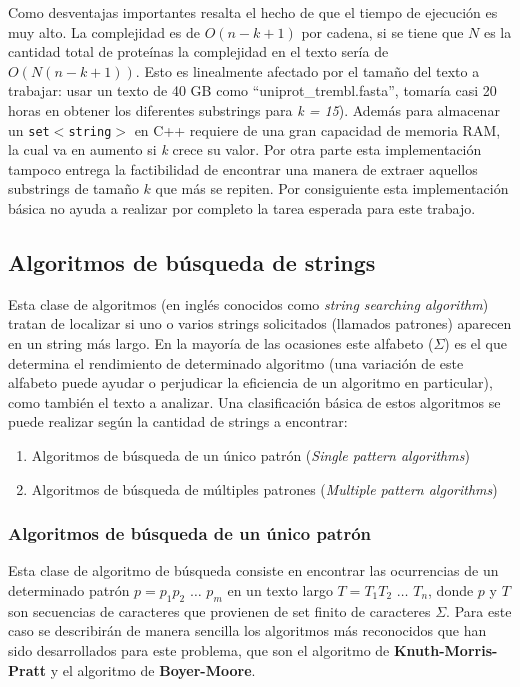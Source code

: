 Como desventajas importantes resalta el hecho de que el tiempo de ejecución es muy alto. La complejidad es de $O(n-k+1)$ por cadena, si se tiene que $N$ es la cantidad total de proteínas la complejidad en el texto sería de $O(N(n-k+1))$. Esto es linealmente afectado por el tamaño del texto a trabajar: usar un texto de 40 GB como ``uniprot\_trembl.fasta'', tomaría casi 20 horas en obtener los diferentes substrings para \textit{k = 15}). Además para almacenar un \texttt{set$<$string$>$} en C++ requiere de una gran capacidad de memoria RAM, la cual va en aumento si \textit{k} crece su valor. Por otra parte esta implementación tampoco entrega la factibilidad de encontrar una manera de extraer aquellos substrings de tamaño $k$ que más se repiten. Por consiguiente esta implementación básica no ayuda a realizar por completo la tarea esperada para este trabajo. 


\subsection{Algoritmos de búsqueda de strings}

Esta clase de algoritmos (en inglés conocidos como \textit{string searching algorithm}) tratan de localizar si uno o varios strings solicitados (llamados patrones) aparecen en un string más largo. En la mayoría de las ocasiones este alfabeto ($\Sigma$) es el que determina el rendimiento de determinado algoritmo (una variación de este alfabeto puede ayudar o perjudicar la eficiencia de un algoritmo en particular), como también el texto a analizar.
Una clasificación básica de estos algoritmos se puede realizar según la cantidad de strings a encontrar:
\begin{enumerate}
\item Algoritmos de búsqueda de un único patrón (\textit{Single pattern algorithms})
\item Algoritmos de búsqueda de múltiples patrones (\textit{Multiple pattern algorithms})
\end{enumerate}

\subsubsection{Algoritmos de búsqueda de un único patrón}

Esta clase de algoritmo de búsqueda consiste en encontrar las ocurrencias de un determinado patrón \cite{stringmatching} $p=p_{1}p_{2}$ $\ldots$ $p_{m}$ en un texto largo $T=T_{1}T_{2}$ $\ldots$ $T_{n}$, donde $p$ y $T$ son secuencias de caracteres que provienen de set finito de caracteres $\Sigma$.
Para este caso se describirán de manera sencilla los algoritmos más reconocidos que han sido desarrollados para este problema, que son el algoritmo de \textbf{Knuth-Morris-Pratt} y el algoritmo de \textbf{Boyer-Moore}.

